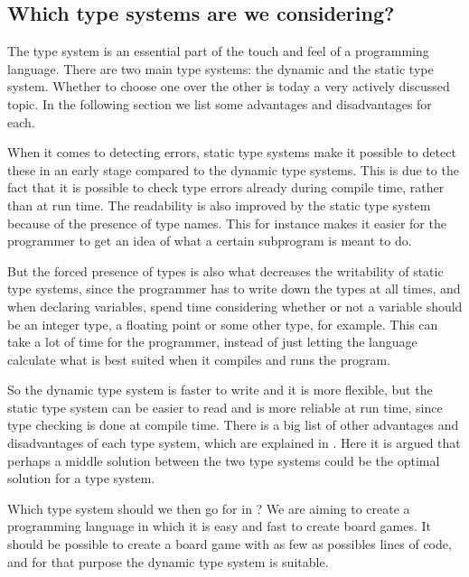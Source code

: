 \subsection{Which type systems are we considering?}
\label{sec:typesystemanalysis}

The type system is an essential part of the touch and feel of a programming
language. There are two main type systems: the dynamic and the static type
system. Whether to choose one over the other is today a very actively discussed
topic. In the following section we list some advantages and disadvantages for
each.

When it comes to detecting errors, static type systems make it possible to
detect these in an early stage compared to the dynamic type systems. This is due
to the fact that it is possible to check type errors already during compile
time, rather than at run time. The readability is also improved by the static
type system because of the presence of type names. This for instance makes it
easier for the programmer to get an idea of what a certain subprogram is meant
to do.

But the forced presence of types is also what decreases the writability of
static type systems, since the programmer has to write down the types at all
times, and when declaring variables, spend time considering whether or not a
variable should be an integer type, a floating point or some other type, for
example. This can take a lot of time for the programmer, instead of just letting
the language calculate what is best suited when it compiles and runs the
program.

So the dynamic type system is faster to write and it is more flexible, but the
static type system can be easier to read and is more reliable at run time, since
type checking is done at compile time. There is a big list of other advantages
and disadvantages of each type system, which are explained in
\cite{staticvsdynamictypesystem}. Here it is argued that perhaps a middle
solution between the two type systems could be the optimal solution for a type
system.

Which type system should we then go for in \productname{}? We are aiming to
create a programming language in which it is easy and fast to create board
games. It should be possible to create a board game with as few as possibles
lines of code, and for that purpose the dynamic type system is suitable.
